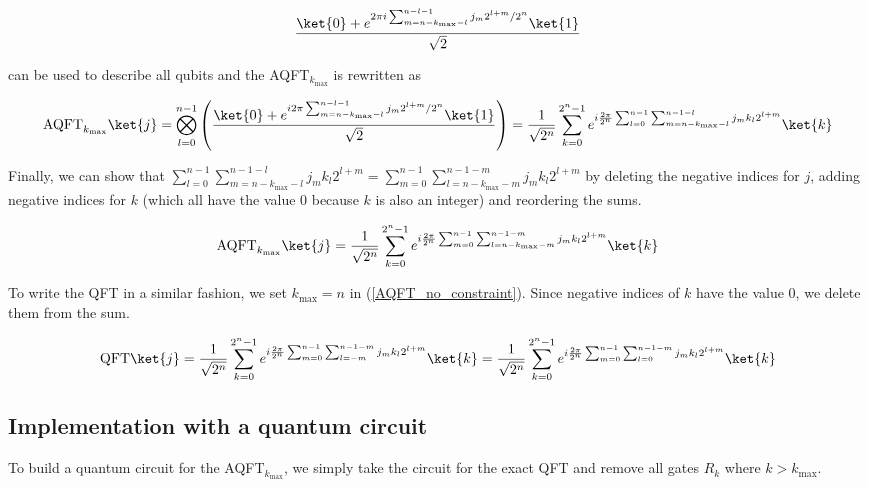 \begin{equation*}
    \frac{\ket{0} + e^{2\pi i \sum_{m=n-k_{\text{max}}-l}^{n-l-1} j_m2^{l+m}/2^n}\ket{1}}{\sqrt{2}}
\end{equation*}

can be used to describe all qubits and the AQFT$_{k_{\text{max}}}$ is rewritten as 

\begin{equation*}
    \text{AQFT}_{k_{\text{max}}}\ket{j} = \bigotimes_{l=0}^{n-1}\left(\frac{\ket{0} + e^{i 2\pi \sum_{m = n-k_{\text{max}}-l}^{n-l-1}j_m2^{l+m}/2^n}\ket{1}}{\sqrt{2}}\right) = \frac{1}{\sqrt{2^n}}\sum_{k=0}^{2^n-1}e^{i \frac{2\pi}{2^n} \sum_{l=0}^{n-1}\sum_{m=n-k_{\text{max}}-l}^{n-1-l}j_mk_l2^{l+m}}\ket{k}
\end{equation*}

Finally, we can show that $\sum_{l=0}^{n-1}\sum_{m=n-k_{\text{max}}-l}^{n-1-l}j_mk_l2^{l+m} = \sum_{m=0}^{n-1}\sum_{l=n-k_{\text{max}}-m}^{n-1-m}j_mk_l2^{l+m}$ by deleting the negative indices for $j$, adding negative indices for $k$ (which all have the value 0 because $k$ is also an integer) and reordering the sums. 

\begin{equation}
    \text{AQFT}_{k_{\text{max}}}\ket{j} = \frac{1}{\sqrt{2^n}}\sum_{k=0}^{2^n-1}e^{i \frac{2\pi}{2^n} \sum_{m=0}^{n-1}\sum_{l=n-k_{\text{max}}-m}^{n-1-m}j_mk_l2^{l+m}}\ket{k}
    \label{AQFT_no_constraint}
\end{equation}

To write the QFT in a similar fashion, we set $k_{\text{max}} = n$ in (\ref{AQFT_no_constraint}). Since negative indices of $k$ have the value 0, we delete them from the sum.

\begin{equation}
    \text{QFT}\ket{j} = \frac{1}{\sqrt{2^n}}\sum_{k=0}^{2^n-1}e^{i \frac{2\pi}{2^n} \sum_{m=0}^{n-1}\sum_{l=-m}^{n-1-m}j_mk_l2^{l+m}}\ket{k} = \frac{1}{\sqrt{2^n}}\sum_{k=0}^{2^n-1}e^{i \frac{2\pi}{2^n} \sum_{m=0}^{n-1}\sum_{l=0}^{n-1-m}j_mk_l2^{l+m}}\ket{k}
    \label{QFT_from_AQFT} 
\end{equation}

\subsection{Implementation with a quantum circuit}
To build a quantum circuit for the AQFT$_{k_{\text{max}}}$, we simply take the circuit for the exact QFT and remove all gates $R_k$ where $k > k_{\text{max}}$.

